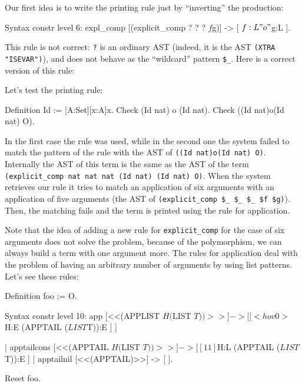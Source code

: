 Our first idea is to write the printing rule just by ``inverting'' the
production:

\begin{coq_example} 
Syntax constr level 6:
  expl_comp [(explicit_comp ? ? ? $f $g)] -> [ $f:L "o" $g:L ].
\end{coq_example}

This rule is not correct: \verb+?+ is an ordinary AST (indeed, it is
the AST \verb|(XTRA "ISEVAR")|), and does not behave as the
``wildcard'' pattern \verb|$_|. Here is a correct version of this
rule:


Let's test the printing rule:

\begin{coq_example}
Definition Id := [A:Set][x:A]x.
Check (Id nat) o (Id nat).
Check ((Id nat)o(Id nat)  O).
\end{coq_example}

In the first case the rule was used, while in the second one the
system failed to match the pattern of the rule with the AST of
\verb+((Id nat)o(Id nat) O)+.
Internally the AST of this term is the same as the AST of the
term \verb+(explicit_comp nat nat nat (Id nat) (Id nat) O)+.
When the system retrieves our rule it tries to match an application of
six arguments with an application of five arguments (the AST of
\verb+(explicit_comp $_ $_ $_ $f $g)+).
  Then, the matching fails and
the term is printed using the rule for application.

Note that the idea of adding a new rule for \verb+explicit_comp+ for
the case of six arguments does not solve the problem, because of the
polymorphism, we can always build a term with one argument more.  The
rules for application deal with the problem of having an arbitrary
number of arguments by using list patterns. Let's see these rules:

\begin{coq_eval}
Definition foo := O.
\end{coq_eval}
\begin{coq_example*}
Syntax constr level 10:
  app [<<(APPLIST $H ($LIST $T))>>] ->
      [ [<hov 0>  $H:E (APPTAIL ($LIST $T)):E ] ]

| apptailcons [<<(APPTAIL $H ($LIST $T))>>] ->
      [ [1 1] $H:L (APPTAIL ($LIST $T)):E ]
| apptailnil [<<(APPTAIL)>>] -> [ ].
\end{coq_example*}
\begin{coq_eval}
Reset foo.
\end{coq_eval}

